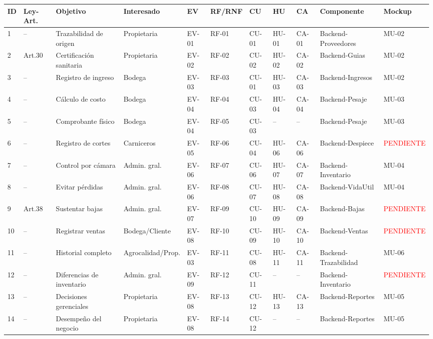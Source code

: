 \documentclass[11pt,a4paper]{article}
\begin{document}
\footnotesize
\begin{longtable}{|p{0.6cm}|p{1.6cm}|p{2.3cm}|p{1.7cm}|p{0.9cm}|p{0.9cm}|p{0.9cm}|p{0.9cm}|p{0.9cm}|p{1.5cm}|p{1.1cm}|}
\hline
\textbf{ID} & \textbf{Ley-Art.} & \textbf{Objetivo} & \textbf{Interesado} & \textbf{EV} & \textbf{RF/RNF} & \textbf{CU} & \textbf{HU} & \textbf{CA} & \textbf{Componente} & \textbf{Mockup} \\
\hline
1 & -- & Trazabilidad de origen & Propietaria & EV-01 & RF-01 & CU-01 & HU-01 & CA-01 & Backend-Proveedores & MU-02 \\
2 & Art.30 & Certificación sanitaria & Propietaria & EV-02 & RF-02 & CU-02 & HU-02 & CA-02 & Backend-Guias & MU-02 \\
3 & -- & Registro de ingreso & Bodega & EV-03 & RF-03 & CU-01 & HU-03 & CA-03 & Backend-Ingresos & MU-02 \\
4 & -- & Cálculo de costo & Bodega & EV-04 & RF-04 & CU-03 & HU-04 & CA-04 & Backend-Pesaje & MU-03 \\
5 & -- & Comprobante físico & Bodega & EV-04 & RF-05 & CU-03 & -- & -- & Backend-Pesaje & MU-03 \\
6 & -- & Registro de cortes & Carniceros & EV-05 & RF-06 & CU-04 & HU-06 & CA-06 & Backend-Despiece & \textcolor{red}{PENDIENTE} \\
7 & -- & Control por cámara & Admin. gral. & EV-06 & RF-07 & CU-06 & HU-07 & CA-07 & Backend-Inventario & MU-04 \\
8 & -- & Evitar pérdidas & Admin. gral. & EV-06 & RF-08 & CU-07 & HU-08 & CA-08 & Backend-VidaUtil & MU-04 \\
9 & Art.38 & Sustentar bajas & Admin. gral. & EV-07 & RF-09 & CU-10 & HU-09 & CA-09 & Backend-Bajas & \textcolor{red}{PENDIENTE} \\
10 & -- & Registrar ventas & Bodega/Cliente & EV-08 & RF-10 & CU-09 & HU-10 & CA-10 & Backend-Ventas & \textcolor{red}{PENDIENTE} \\
11 & -- & Historial completo & Agrocalidad/Prop. & EV-03 & RF-11 & CU-08 & HU-11 & CA-11 & Backend-Trazabilidad & MU-06 \\
12 & -- & Diferencias de inventario & Admin. gral. & EV-09 & RF-12 & CU-11 & -- & -- & Backend-Inventario & \textcolor{red}{PENDIENTE} \\
13 & -- & Decisiones gerenciales & Propietaria & EV-08 & RF-13 & CU-12 & HU-13 & CA-13 & Backend-Reportes & MU-05 \\
14 & -- & Desempeño del negocio & Propietaria & EV-08 & RF-14 & CU-12 & -- & -- & Backend-Reportes & MU-05 \\

\end{longtable}
\end{document}
